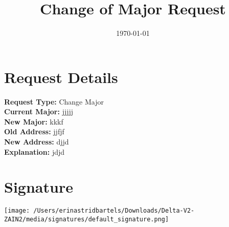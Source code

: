 \documentclass{article}
\begin{document}
\title{Change of Major Request}
\date{\today}

\maketitle



\section*{Request Details}
\textbf{Request Type:} Change Major \\
\textbf{Current Major:} jjjjj \\
\textbf{New Major:} kkkf \\
\textbf{Old Address:} jjfjf \\
\textbf{New Address:} djjd \\
\textbf{Explanation:} jdjd

\section*{Signature}
\vspace{1cm}
\texttt{[image: /Users/erinastridbartels/Downloads/Delta-V2-ZAIN2/media/signatures/default\_signature.png]} %
\end{document}
